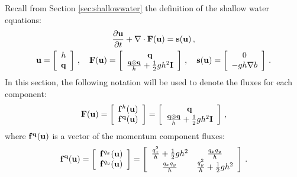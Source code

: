 Recall from Section \ref{sec:shallowwater} the definition of the shallow
water equations:
\begin{equation}
\begin{gathered}
  \ppt{\vectorsolution} + \nabla\cdot\consfluxvector
  = \conssource \eqc
\\
  \vectorsolution
    = \left[\begin{array}{c}\height\\\heightmomentum\end{array}\right]
  \eqc\quad
  \consfluxvector
  = \left[\begin{array}{c}\heightmomentum\\
      \frac{\heightmomentum\otimes\heightmomentum}{\height}
      + \half\gravity\height^2\identity
    \end{array}\right]
  \eqc\quad
  \conssource
  = \left[\begin{array}{c}0\\-\gravity\height\nabla\bathymetry\end{array}
    \right] \eqp
\end{gathered}
\end{equation}
In this section, the following notation will be used to denote the fluxes
for each component:
\[
  \consfluxvector
  = \left[\begin{array}{c}
    \mathbf{\consfluxletter}^\height(\vectorsolution)\\
    \mathbf{\consfluxletter}^\heightmomentum(\vectorsolution)
    \end{array}\right]
  = \left[\begin{array}{c}\heightmomentum\\
      \frac{\heightmomentum\otimes\heightmomentum}{\height}
      + \half\gravity\height^2\identity
    \end{array}\right] \eqc
\]
where $\mathbf{f}^{\mathbf{q}}(\mathbf{u})$ is a vector
of the momentum component fluxes:
\[
  \mathbf{f}^{\mathbf{q}}(\mathbf{u})
  = \left[\begin{array}{c}
    \mathbf{f}^{q_x}(\mathbf{u})\\
    \mathbf{f}^{q_y}(\mathbf{u})
    \end{array}\right]
  = \left[\begin{array}{c c}
    \frac{q_x^2}{h} + \frac{1}{2}gh^2
      & \frac{q_xq_y}{h}\\
    \frac{q_xq_y}{h}
      & \frac{q_y^2}{h} + \frac{1}{2}gh^2\\
    \end{array}\right] \,.
\]

